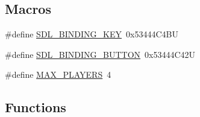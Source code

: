 \subsection*{Macros}
\begin{DoxyCompactItemize}
\item 
\#define \mbox{\hyperlink{sdl-events_8h_a30324d21acbaca0e7e533cb591c10439}{S\+D\+L\+\_\+\+B\+I\+N\+D\+I\+N\+G\+\_\+\+K\+EY}}~0x53444\+C4\+BU
\item 
\#define \mbox{\hyperlink{sdl-events_8h_ad7fa2c6a878392c31b7b77514a1e832e}{S\+D\+L\+\_\+\+B\+I\+N\+D\+I\+N\+G\+\_\+\+B\+U\+T\+T\+ON}}~0x53444\+C42U
\item 
\#define \mbox{\hyperlink{sdl-events_8h_a1c346c944e8204fd06dc057393c7c96d}{M\+A\+X\+\_\+\+P\+L\+A\+Y\+E\+RS}}~4
\end{DoxyCompactItemize}
\subsection*{Functions}

